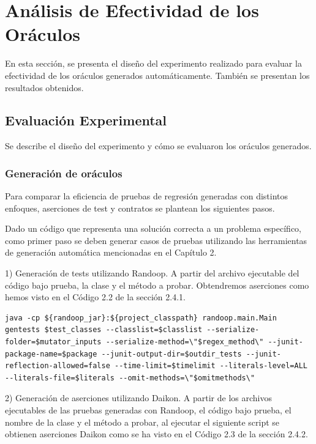\chapter{Análisis de Efectividad de los Oráculos}

En esta sección, se presenta el diseño del experimento realizado para evaluar la efectividad de los oráculos generados automáticamente. También se presentan los resultados obtenidos.

\section{Evaluación Experimental}

Se describe el diseño del experimento y cómo se evaluaron los oráculos generados.

\subsection{Generación de oráculos}

Para comparar la eficiencia de pruebas de regresión generadas con distintos enfoques, aserciones de test y contratos se plantean los siguientes pasos. 

Dado un código que representa una solución correcta a un problema específico, como primer paso se deben generar casos de pruebas utilizando las herramientas de generación automática mencionadas en el Capítulo 2.

1) Generación de tests utilizando Randoop.
A partir del archivo ejecutable del código bajo prueba, la clase y el método a probar. Obtendremos aserciones como hemos visto en el Código 2.2 de la sección 2.4.1.


\begin{lstlisting}[style=bashstyle, caption=Generación de tests con Randoop, label=lst:bashcode]
java -cp ${randoop_jar}:${project_classpath} randoop.main.Main gentests $test_classes --classlist=$classlist --serialize-folder=$mutator_inputs --serialize-method=\"$regex_method\" --junit-package-name=$package --junit-output-dir=$outdir_tests --junit-reflection-allowed=false --time-limit=$timelimit --literals-level=ALL --literals-file=$literals --omit-methods=\"$omitmethods\"
\end{lstlisting}


2) Generación de aserciones utilizando Daikon. 
A partir de los archivos ejecutables de las pruebas generadas con Randoop, el código bajo prueba, el nombre de la clase y el método a probar, al ejecutar el siguiente script se obtienen aserciones Daikon como se ha visto en el Código 2.3 de la sección 2.4.2.

